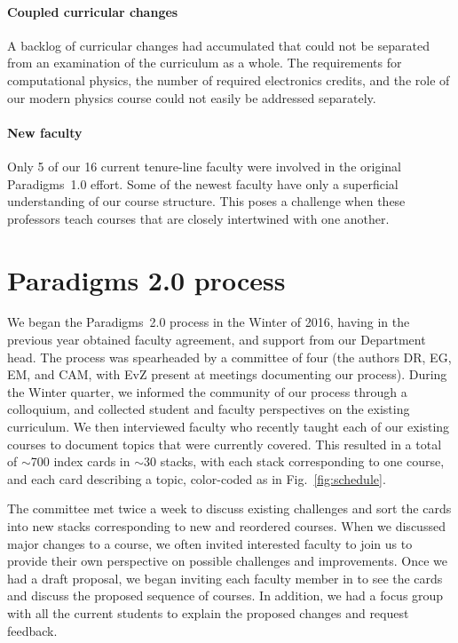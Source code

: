 \documentclass[english,aps,pra,reprint,noshowpacs,superscriptaddress]{revtex4-1}
\begin{document}
\paragraph{Coupled curricular changes}
A backlog of curricular changes had accumulated that could not be
separated from an examination of the curriculum as a whole.  The requirements
for computational physics, the number of required electronics credits, and the
role of our modern physics course could not easily be addressed separately.

\paragraph{New faculty}

Only 5 of our 16 current tenure-line faculty were involved in the
original Paradigms~1.0 effort.  Some of the newest faculty have only a
superficial understanding of our course structure.  This poses a
challenge when these professors teach courses that are closely
intertwined with one another.

\section{Paradigms 2.0 process}
We began the Paradigms~2.0 process in the Winter of 2016, having in
the previous year obtained faculty agreement, and support from our
Department head.  The process was spearheaded by a committee of four
(the authors DR, EG, EM, and CAM, with EvZ present at meetings
documenting our process).  During the Winter quarter, we informed the
community of our process through a colloquium, and collected student
and faculty perspectives on the existing curriculum.  We then
interviewed faculty who recently taught each of our existing courses
to document topics that were currently covered.  This resulted in a
total of $\sim$700 index cards in $\sim$30 stacks, with each stack
corresponding to one course, and each card describing a topic,
color-coded as in Fig.~\ref{fig:schedule}.

The committee met twice a week to discuss existing challenges and sort
the cards into new stacks corresponding to new and reordered courses.
When we discussed major changes to a course, we often invited
interested faculty to join us to provide their own perspective on
possible challenges and improvements.  Once we had a draft proposal,
we began inviting each faculty member in to see the cards and discuss
the proposed sequence of courses.  In addition, we had a focus group with
all the current students to explain the proposed changes and request
feedback.
\end{document}
